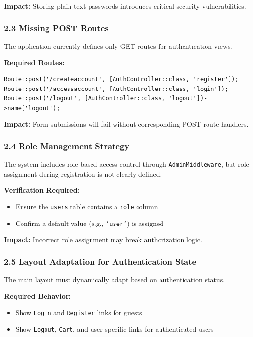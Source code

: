 \documentclass[12pt,a4paper]{article}
\begin{document}
\textbf{Impact:} Storing plain-text passwords introduces critical security vulnerabilities.

\subsubsection{2.3 Missing POST Routes}

The application currently defines only GET routes for authentication views.

\textbf{Required Routes:}

\begin{verbatim}
Route::post('/createaccount', [AuthController::class, 'register']);
Route::post('/accessaccount', [AuthController::class, 'login']);
Route::post('/logout', [AuthController::class, 'logout'])->name('logout');
\end{verbatim}

\textbf{Impact:} Form submissions will fail without corresponding POST route handlers.

\subsubsection{2.4 Role Management Strategy}

The system includes role-based access control through \texttt{AdminMiddleware}, but role assignment during registration is not clearly defined.

\textbf{Verification Required:}
\begin{itemize}[noitemsep]
    \item Ensure the \texttt{users} table contains a \texttt{role} column
    \item Confirm a default value (e.g., \texttt{'user'}) is assigned
\end{itemize}

\textbf{Impact:} Incorrect role assignment may break authorization logic.

\subsubsection{2.5 Layout Adaptation for Authentication State}

The main layout must dynamically adapt based on authentication status.

\textbf{Required Behavior:}
\begin{itemize}[noitemsep]
    \item Show \texttt{Login} and \texttt{Register} links for guests
    \item Show \texttt{Logout}, \texttt{Cart}, and user-specific links for authenticated users
\end{itemize}
\end{document}
